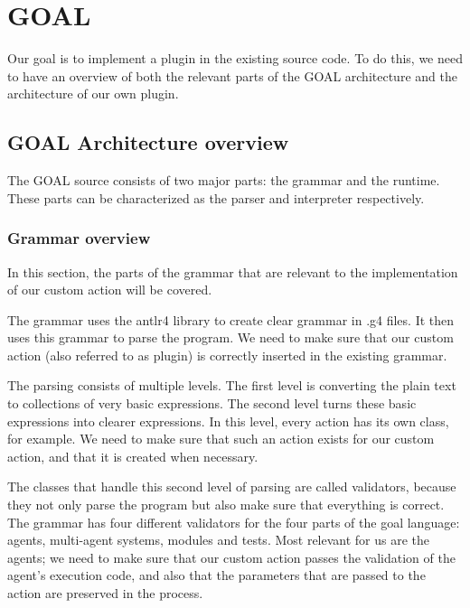 \section{GOAL}
Our goal is to implement a plugin in the existing source code. To do this, we need to have an overview of both the relevant parts of the GOAL architecture and the architecture of our own plugin.

\subsection{GOAL Architecture overview}
The GOAL source consists of two major parts: the grammar and the runtime. These parts can be characterized as the parser and interpreter respectively.

\subsubsection{Grammar overview}
In this section, the parts of the grammar that are relevant to the implementation of our custom action will be covered. \\ \par

The grammar uses the antlr4 library to create clear grammar in .g4 files. It then uses this grammar to parse the program. We need to make sure that our custom action (also referred to as plugin) is correctly inserted in the existing grammar. \\ \par

The parsing consists of multiple levels. The first level is converting the plain text to collections of very basic expressions. The second level turns these basic expressions into clearer expressions. In this level, every action has its own class, for example. We need to make sure that such an action exists for our custom action, and that it is created when necessary. \\ \par

The classes that handle this second level of parsing are called validators, because they not only parse the program but also make sure that everything is correct. The grammar has four different validators for the four parts of the goal language: agents, multi-agent systems, modules and tests. Most relevant for us are the agents; we need to make sure that our custom action passes the validation of the agent's execution code, and also that the parameters that are passed to the action are preserved in the process. \\ \par

